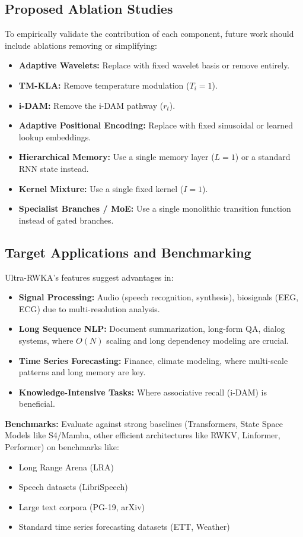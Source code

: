 \documentclass{article}
\begin{document}
\subsection{Proposed Ablation Studies}
To empirically validate the contribution of each component, future work should include ablations removing or simplifying:
\begin{itemize}
    \item \textbf{Adaptive Wavelets:} Replace with fixed wavelet basis or remove entirely.
    \item \textbf{TM-KLA:} Remove temperature modulation ($T_i=1$).
    \item \textbf{i-DAM:} Remove the i-DAM pathway ($r_t$).
    \item \textbf{Adaptive Positional Encoding:} Replace with fixed sinusoidal or learned lookup embeddings.
    \item \textbf{Hierarchical Memory:} Use a single memory layer ($L=1$) or a standard RNN state instead.
    \item \textbf{Kernel Mixture:} Use a single fixed kernel ($I=1$).
    \item \textbf{Specialist Branches / MoE:} Use a single monolithic transition function instead of gated branches.
\end{itemize}

\subsection{Target Applications and Benchmarking}
Ultra-RWKA's features suggest advantages in:
\begin{itemize}
    \item \textbf{Signal Processing:} Audio (speech recognition, synthesis), biosignals (EEG, ECG) due to multi-resolution analysis.
    \item \textbf{Long Sequence NLP:} Document summarization, long-form QA, dialog systems, where $O(N)$ scaling and long dependency modeling are crucial.
    \item \textbf{Time Series Forecasting:} Finance, climate modeling, where multi-scale patterns and long memory are key.
    \item \textbf{Knowledge-Intensive Tasks:} Where associative recall (i-DAM) is beneficial.
\end{itemize}
\textbf{Benchmarks:} Evaluate against strong baselines (Transformers, State Space Models like S4/Mamba, other efficient architectures like RWKV, Linformer, Performer) on benchmarks like:
\begin{itemize}
    \item Long Range Arena (LRA)
    \item Speech datasets (LibriSpeech)
    \item Large text corpora (PG-19, arXiv)
    \item Standard time series forecasting datasets (ETT, Weather)
\end{itemize}
\end{document}
